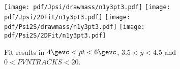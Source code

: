 \begin{figure}[H]
\begin{center}
\texttt{[image: pdf/Jpsi/drawmass/n1y3pt3.pdf]}
\texttt{[image: pdf/Jpsi/2DFit/n1y3pt3.pdf]}
\vspace*{-0.5cm}
\texttt{[image: pdf/Psi2S/drawmass/n1y3pt3.pdf]}
\texttt{[image: pdf/Psi2S/2DFit/n1y3pt3.pdf]}
\vspace*{-0.5cm}
\end{center}
\caption{Fit results in $4\gevc<pt<6\gevc$, $3.5<y<4.5$ and $0<PVNTRACKS<20$.}
\label{Fitn1y3pt3}
\end{figure}
